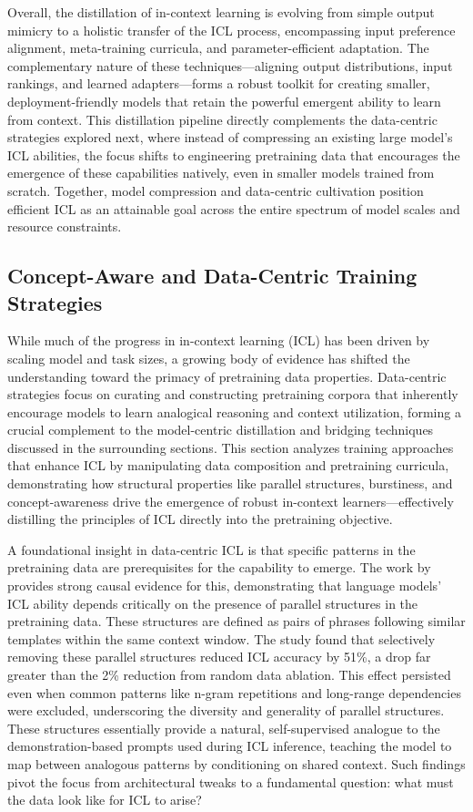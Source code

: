 \documentclass[11pt]{article}
\begin{document}
Overall, the distillation of in-context learning is evolving from simple output mimicry to a holistic transfer of the ICL process, encompassing input preference alignment, meta-training curricula, and parameter-efficient adaptation. The complementary nature of these techniques---aligning output distributions, input rankings, and learned adapters---forms a robust toolkit for creating smaller, deployment-friendly models that retain the powerful emergent ability to learn from context. This distillation pipeline directly complements the data-centric strategies explored next, where instead of compressing an existing large model's ICL abilities, the focus shifts to engineering pretraining data that encourages the emergence of these capabilities natively, even in smaller models trained from scratch. Together, model compression and data-centric cultivation position efficient ICL as an attainable goal across the entire spectrum of model scales and resource constraints.

\subsection{Concept-Aware and Data-Centric Training Strategies}

While much of the progress in in-context learning (ICL) has been driven by scaling model and task sizes, a growing body of evidence has shifted the understanding toward the primacy of pretraining data properties. Data-centric strategies focus on curating and constructing pretraining corpora that inherently encourage models to learn analogical reasoning and context utilization, forming a crucial complement to the model-centric distillation and bridging techniques discussed in the surrounding sections. This section analyzes training approaches that enhance ICL by manipulating data composition and pretraining curricula, demonstrating how structural properties like parallel structures, burstiness, and concept-awareness drive the emergence of robust in-context learners---effectively distilling the principles of ICL directly into the pretraining objective.

A foundational insight in data-centric ICL is that specific patterns in the pretraining data are prerequisites for the capability to emerge. The work by \cite{ref67} provides strong causal evidence for this, demonstrating that language models' ICL ability depends critically on the presence of parallel structures in the pretraining data. These structures are defined as pairs of phrases following similar templates within the same context window. The study found that selectively removing these parallel structures reduced ICL accuracy by 51\%, a drop far greater than the 2\% reduction from random data ablation. This effect persisted even when common patterns like n-gram repetitions and long-range dependencies were excluded, underscoring the diversity and generality of parallel structures. These structures essentially provide a natural, self-supervised analogue to the demonstration-based prompts used during ICL inference, teaching the model to map between analogous patterns by conditioning on shared context. Such findings pivot the focus from architectural tweaks to a fundamental question: what must the data look like for ICL to arise?
\end{document}
